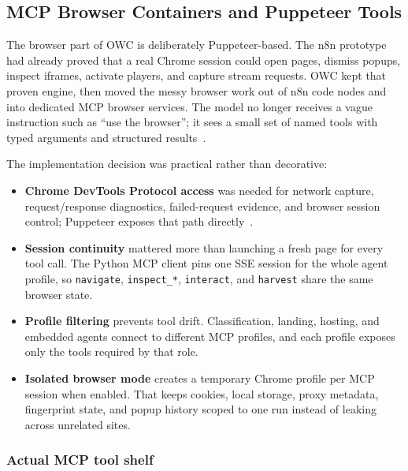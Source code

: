 






\subsection{MCP Browser Containers and Puppeteer Tools}

The browser part of OWC is deliberately Puppeteer-based. The n8n prototype had already
proved that a real Chrome session could open pages, dismiss popups, inspect iframes,
activate players, and capture stream requests. OWC kept that proven engine, then moved
the messy browser work out of n8n code nodes and into dedicated MCP browser services.
The model no longer receives a vague instruction such as ``use the browser''; it sees a
small set of named tools with typed arguments and structured results~\cite{mcp-spec}.

The implementation decision was practical rather than decorative:
\begin{itemize}
  \item \textbf{Chrome DevTools Protocol access} was needed for network capture,
  request/response diagnostics, failed-request evidence, and browser session control;
  Puppeteer exposes that path directly~\cite{puppeteer,cdp}.
  \item \textbf{Session continuity} mattered more than launching a fresh page for every
  tool call. The Python MCP client pins one SSE session for the whole agent profile, so
  \texttt{navigate}, \texttt{inspect\_*}, \texttt{interact}, and \texttt{harvest} share
  the same browser state.
  \item \textbf{Profile filtering} prevents tool drift. Classification, landing,
  hosting, and embedded agents connect to different MCP profiles, and each profile
  exposes only the tools required by that role.
  \item \textbf{Isolated browser mode} creates a temporary Chrome profile per MCP
  session when enabled. That keeps cookies, local storage, proxy metadata, fingerprint
  state, and popup history scoped to one run instead of leaking across unrelated sites.
\end{itemize}

\subsubsection{Actual MCP tool shelf}

